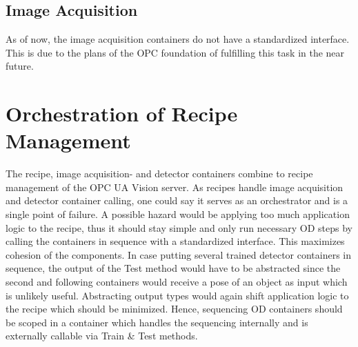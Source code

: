 \subsection{Image Acquisition}
As of now, the image acquisition containers do not have a standardized interface. This is due to the plans of the OPC foundation of fulfilling this task in the near future.

\section{Orchestration of Recipe Management}
The recipe, image acquisition- and  detector containers combine to recipe management of the OPC UA Vision server. As recipes handle image acquisition and detector container calling, one could say it serves as an orchestrator and is a single point of failure. A possible hazard would be applying too much application logic to the recipe, thus it should stay simple and only run necessary OD steps by calling the containers in sequence with a standardized interface. This maximizes cohesion of the components. In case putting several trained detector containers in sequence, the output of the Test method would have to be abstracted since the second and following containers would receive a pose of an object as input which is unlikely useful. Abstracting output types would again shift application logic to the recipe which should be minimized. Hence, sequencing OD containers should be scoped in a container which handles the sequencing internally and is externally callable via Train & Test methods.